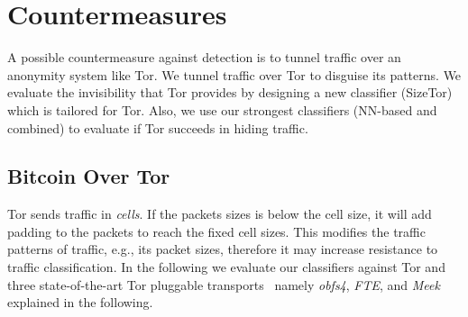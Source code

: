 \section{Countermeasures}
A possible countermeasure against \bc detection is to tunnel \bc traffic over 
an anonymity system like Tor. We tunnel \bc traffic over Tor to disguise its patterns. We evaluate the invisibility that Tor provides by designing a new classifier (SizeTor) which is tailored for Tor. Also, we use our strongest classifiers (NN-based and combined) to evaluate if Tor succeeds in hiding \bc traffic.

\subsection{Bitcoin Over Tor}\label{sec:tor}
Tor sends traffic in \textit{cells}. If the packets sizes is below the cell size, it will add padding to the packets to reach the fixed cell sizes. This modifies the traffic patterns of \bc traffic, e.g., its packet sizes, therefore it may increase resistance to traffic classification. 
In the following we evaluate our classifiers against Tor and three state-of-the-art Tor 
pluggable transports~\cite{pluggable-transport} namely \textit{obfs4}, \textit{FTE}, and \textit{Meek} explained in the following. 
